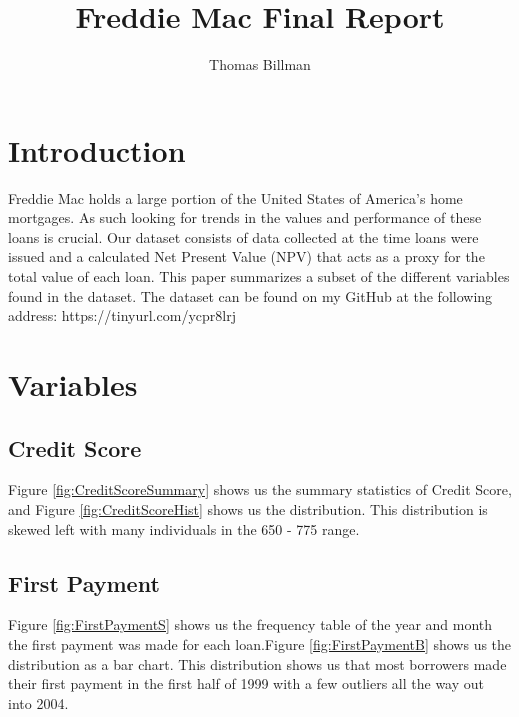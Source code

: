 \documentclass[10pt,twocolumn,letterpaper]{article}
\begin{document}
\title{Freddie Mac Final Report}

\author{Thomas Billman}

\maketitle


\section{Introduction}

Freddie Mac holds a large portion of the United States of America's home mortgages. As such looking for trends in the values and performance of these loans is crucial. Our dataset consists of data collected at the time loans were issued and a calculated Net Present Value (NPV) that acts as a proxy for the total value of each loan. This paper summarizes a subset of the different variables found in the dataset. The dataset can be found on my GitHub at the following address:
https://tinyurl.com/ycpr8lrj

\section{Variables}
\subsection{Credit Score}

Figure \ref{fig:CreditScoreSummary} shows us the summary statistics of Credit Score, and Figure \ref{fig:CreditScoreHist} shows us the distribution. This distribution is skewed left with many individuals in the 650 - 775 range. 

\subsection{First Payment}

Figure \ref{fig:FirstPaymentS} shows us the frequency table of the year and month the first payment was made for each loan.Figure \ref{fig:FirstPaymentB} shows us the distribution as a bar chart. This distribution shows us that most borrowers made their first payment in the first half of 1999 with a few outliers all the way out into 2004.
\end{document}
